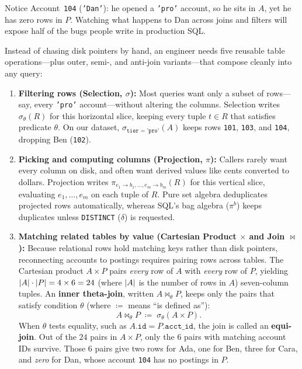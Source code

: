 Notice Account~\texttt{104} (\texttt{'Dan'}): he opened a \texttt{'pro'} account, so he sits in $A$, yet he has zero rows in $P$. Watching what happens to Dan across joins and filters will expose half of the bugs people write in production SQL.

Instead of chasing disk pointers by hand, an engineer needs five reusable table operations---plus outer, semi-, and anti-join variants---that compose cleanly into any query:

\begin{enumerate}
  \item \textbf{Filtering rows (Selection, $\sigma$):} Most queries want only a subset of rows---say, every \texttt{'pro'} account---without altering the columns. Selection writes $\sigma_\theta(R)$ for this horizontal slice, keeping every tuple $t \in R$ that satisfies predicate $\theta$. On our dataset, $\sigma_{\texttt{tier = 'pro'}}(A)$ keeps rows \texttt{101}, \texttt{103}, and \texttt{104}, dropping Ben (\texttt{102}).
  \item \textbf{Picking and computing columns (Projection, $\pi$):} Callers rarely want every column on disk, and often want derived values like cents converted to dollars. Projection writes $\pi_{e_1 \to b_1, \dots, e_m \to b_m}(R)$ for this vertical slice, evaluating $e_1, \dots, e_m$ on each tuple of $R$. Pure set algebra deduplicates projected rows automatically, whereas SQL's bag algebra ($\pi^b$) keeps duplicates unless \texttt{DISTINCT} ($\delta$) is requested.
  \item \textbf{Matching related tables by value (Cartesian Product $\times$ and Join $\bowtie$):} Because relational rows hold matching keys rather than disk pointers, reconnecting accounts to postings requires pairing rows across tables. The Cartesian product $A \times P$ pairs \emph{every} row of $A$ with \emph{every} row of $P$, yielding $\lvert A\rvert\cdot\lvert P\rvert = 4 \times 6 = 24$ (where $\lvert A\rvert$ is the number of rows in $A$) seven-column tuples. An \textbf{inner theta-join}, written $A \bowtie_\theta P$, keeps only the pairs that satisfy condition $\theta$ (where $\coloneqq$ means ``is defined as''):
  \[
    A \bowtie_{\theta} P \;\coloneqq\; \sigma_{\theta}(A \times P).
  \]
  When $\theta$ tests equality, such as $A.\texttt{id} = P.\texttt{acct\_id}$, the join is called an \textbf{equi-join}. Out of the $24$ pairs in $A \times P$, only the $6$ pairs with matching account IDs survive. Those $6$ pairs give two rows for Ada, one for Ben, three for Cara, and \emph{zero} for Dan, whose account \texttt{104} has no postings in $P$.

\end{enumerate}
